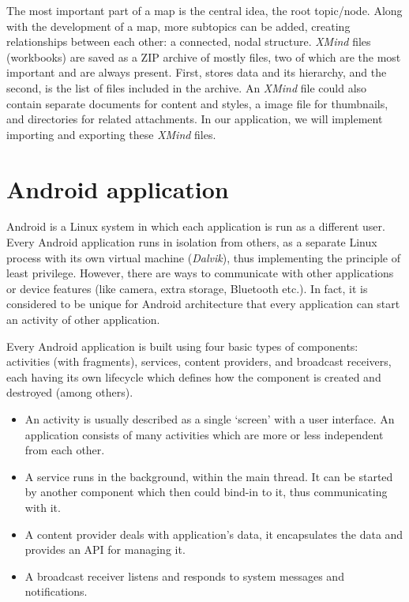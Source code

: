 The most important part of a map is the central idea, the root topic/node. Along with the development of a map, more subtopics can be added, creating relationships between each other: a connected, nodal structure. {\em XMind} files (workbooks) are saved as a ZIP archive of mostly  files, two of which are the most important and are always present. First,  stores data and its hierarchy, and the second,  is the list of files included in the archive. An {\em XMind} file could also contain separate  documents for content and styles, a  image file for thumbnails, and directories for related attachments. In our application, we will implement importing and exporting these {\em XMind} files.

\section{Android application}
\label{androidsdk}

Android is a Linux system in which each application is run as a different user. Every Android application runs in isolation from others, as a separate Linux process with its own virtual machine ({\em Dalvik}), thus implementing the principle of least privilege. However,  there are ways to communicate with other applications or device features (like camera, extra storage, Bluetooth etc.). In fact, it is considered to be unique for Android architecture that every application can start an activity of other application.

Every Android application is built using four basic types of components: activities (with fragments), services, content providers, and broadcast receivers, each having its own lifecycle which defines how the component is created and destroyed (among others).

\begin{itemize}
	\item An activity is usually described as a single `screen' with a user interface. An application consists of many activities which are more or less independent from each other.
	\item A service runs in the background, within the main thread. It can be started by another component which then could bind-in to it, thus communicating with it.
	\item A content provider deals with application's data, it encapsulates the data and provides an API for managing it.
	\item A broadcast receiver listens and responds to system messages and notifications.
\end{itemize}


